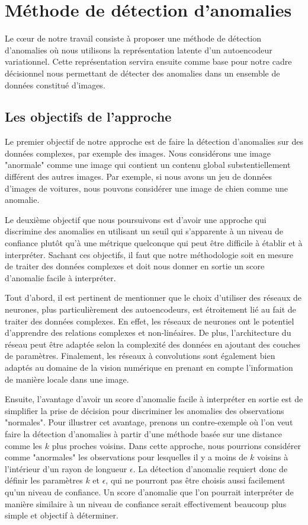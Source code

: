 \chapter{Méthode de détection d'anomalies}     %
\label{chap:methodologie}                   %

Le cœur de notre travail consiste à proposer une méthode de détection d'anomalies où nous utilisons la représentation latente d'un autoencodeur variationnel. Cette représentation servira ensuite comme base pour notre cadre décisionnel nous permettant de détecter des anomalies dans un ensemble de données constitué d'images.

\section{Les objectifs de l'approche} \label{objectifs_metho}

Le premier objectif de notre approche est de faire la détection d'anomalies sur des données complexes, par exemple des images. Nous considérons une image "anormale" comme une image qui contient un contenu global substentiellement différent des autres images. Par exemple, si nous avons un jeu de données d'images de voitures, nous pouvons considérer une image de chien comme une anomalie. 

Le deuxième objectif que nous poursuivons est d'avoir une approche qui discrimine des anomalies en utilisant un seuil qui s'apparente à un niveau de confiance plutôt qu'à une métrique quelconque qui peut être difficile à établir et à interpréter. Sachant ces objectifs, il faut que notre méthodologie soit en mesure de traiter des données complexes et doit nous donner en sortie un score d'anomalie facile à interpréter.

Tout d'abord, il est pertinent de mentionner que le choix d'utiliser des réseaux de neurones, plus particulièrement des autoencodeurs, est étroitement lié au fait de traiter des données complexes. En effet, les réseaux de neurones ont le potentiel d'apprendre des relations complexes et non-linéaires. De plus, l'architecture du réseau peut être adaptée selon la complexité des données en ajoutant des couches de paramètres. Finalement, les réseaux à convolutions sont également bien adaptés au domaine de la vision numérique en prenant en compte l'information de manière locale dans une image.

Ensuite, l'avantage d'avoir un score d'anomalie facile à interpréter en sortie est de simplifier la prise de décision pour discriminer les anomalies des observations "normales". Pour illustrer cet avantage, prenons un contre-exemple où l'on veut faire la détection d'anomalies à partir d'une méthode basée sur une distance comme les $k$ plus proches voisins. Dans cette approche, nous pourrions considérer comme "anormales" les observations pour lesquelles il y a moins de $k$ voisins à l'intérieur d'un rayon de longueur $\epsilon$. La détection d'anomalie requiert donc de définir les paramètres $k$ et $\epsilon$, qui ne pourront pas être choisis aussi facilement qu'un niveau de confiance. Un score d'anomalie que l'on pourrait interpréter de manière similaire à un niveau de confiance serait effectivement beaucoup plus simple et objectif à déterminer.

